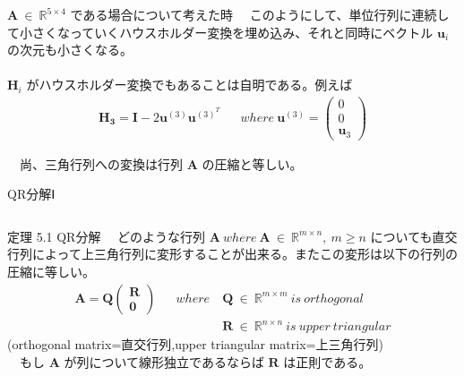 \documentclass[dvipdfmx,10pt,presentation]{beamer}
\begin{document}
\begin{frame}[allowframebreaks]{\(\bm{A}\ \in\ \mathbb{R}^{5\times4}\) である場合について考えた時}
　このようにして、単位行列に連続して小さくなっていくハウスホルダー変換を埋め込み、それと同時にベクトル \(\bm{u}_i\) の次元も小さくなる。\\
　\\
\(\bm{H}_i\) がハウスホルダー変換でもあることは自明である。例えば\\

\begin{align*}
\bm{H_3} = \bm{I} - 2 \bm{u}^{(3)} \bm{u}^{(3)^T} 
&&  where\ \bm{u}^{(3)}=
\begin{pmatrix}
0 \\
0 \\
\bm{u}_3
\end{pmatrix}
\end{align*}

　尚、三角行列への変換は行列 \(\bm{A}\) の圧縮と等しい。\\
\end{frame}
\begin{frame}[label={sec:org669bf76}]{QR分解Ⅰ}
\begin{columns}
\begin{column}{1.00\columnwidth}
\begin{block}{定理 5.1 QR分解}
　どのような行列 \(\bm{A}\ where\ \bm{A}\ \in\ \mathbb{R}^{m\times n},\ m \geq n\) についても直交行列によって上三角行列に変形することが出来る。またこの変形は以下の行列の圧縮に等しい。\\

\begin{align*}
\bm{A} = \bm{Q}
\begin{pmatrix}
\bm{R}\\
\bm{0}
\end{pmatrix}&& where\ &\bm{Q}\ \in\ \mathbb{R}^{m\times m}\ is\ orthogonal \\
             &&& \bm{R}\ \in\ \mathbb{R}^{n\times n}\ is\ upper\ triangular
\end{align*}
(orthogonal matrix=直交行列,upper triangular matrix=上三角行列)\\
　もし \(\bm{A}\) が列について線形独立であるならば \(\bm{R}\) は正則である。\\
\end{block}
\end{column}
\end{columns}
\end{frame}
\end{document}

